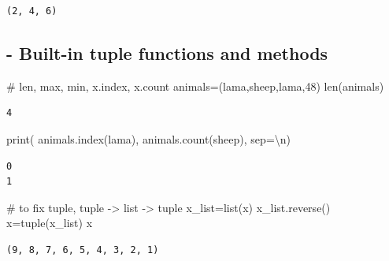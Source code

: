 \documentclass[
  a4paper,
  DIV=11,
  numbers=noendperiod]{scrreprt}
\newenvironment{Shaded}{\begin{snugshade}}{\end{snugshade}}
\newcommand{\BuiltInTok}[1]{\textcolor[rgb]{0.00,0.23,0.31}{#1}}
\newcommand{\CharTok}[1]{\textcolor[rgb]{0.13,0.47,0.30}{#1}}
\newcommand{\CommentTok}[1]{\textcolor[rgb]{0.37,0.37,0.37}{#1}}
\newcommand{\DecValTok}[1]{\textcolor[rgb]{0.68,0.00,0.00}{#1}}
\newcommand{\NormalTok}[1]{\textcolor[rgb]{0.00,0.23,0.31}{#1}}
\newcommand{\OperatorTok}[1]{\textcolor[rgb]{0.37,0.37,0.37}{#1}}
\newcommand{\StringTok}[1]{\textcolor[rgb]{0.13,0.47,0.30}{#1}}
\begin{document}
\begin{verbatim}
(2, 4, 6)
\end{verbatim}

\subsection{- Built-in tuple functions and
methods}\label{built-in-tuple-functions-and-methods}

\begin{Shaded}
\begin{Highlighting}[]
\CommentTok{\# len, max, min, x.index, x.count}
\NormalTok{animals}\OperatorTok{=}\NormalTok{(}\StringTok{\textquotesingle{}lama\textquotesingle{}}\NormalTok{,}\StringTok{\textquotesingle{}sheep\textquotesingle{}}\NormalTok{,}\StringTok{\textquotesingle{}lama\textquotesingle{}}\NormalTok{,}\DecValTok{48}\NormalTok{)}
\BuiltInTok{len}\NormalTok{(animals)}
\end{Highlighting}
\end{Shaded}

\begin{verbatim}
4
\end{verbatim}

\begin{Shaded}
\begin{Highlighting}[]
\BuiltInTok{print}\NormalTok{(}
\NormalTok{    animals.index(}\StringTok{\textquotesingle{}lama\textquotesingle{}}\NormalTok{),}
\NormalTok{    animals.count(}\StringTok{\textquotesingle{}sheep\textquotesingle{}}\NormalTok{),}
\NormalTok{    sep}\OperatorTok{=}\StringTok{\textquotesingle{}}\CharTok{\textbackslash{}n}\StringTok{\textquotesingle{}}\NormalTok{)}
\end{Highlighting}
\end{Shaded}

\begin{verbatim}
0
1
\end{verbatim}

\begin{Shaded}
\begin{Highlighting}[]
\CommentTok{\# to fix tuple, tuple {-}\textgreater{} list {-}\textgreater{} tuple}
\NormalTok{x\_list}\OperatorTok{=}\BuiltInTok{list}\NormalTok{(x)}
\NormalTok{x\_list.reverse()}
\NormalTok{x}\OperatorTok{=}\BuiltInTok{tuple}\NormalTok{(x\_list)}
\NormalTok{x}
\end{Highlighting}
\end{Shaded}

\begin{verbatim}
(9, 8, 7, 6, 5, 4, 3, 2, 1)
\end{verbatim}
\end{document}
